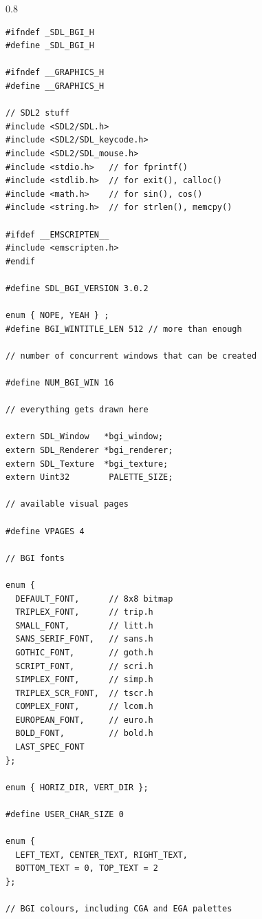 \documentclass[a4paper,12pt]{article}
\newenvironment{margins}[2]
{ %
\begin{list}{}
{
\setlength{\leftmargin}{#1}
\setlength{\rightmargin}{#2}
} \item
} %
{\end{list}}
\begin{document}
\begin{margins}{-0.5cm}{-0.5cm}

\begin{spacing}{0.8}
\begin{lstlisting}
#ifndef _SDL_BGI_H
#define _SDL_BGI_H

#ifndef __GRAPHICS_H
#define __GRAPHICS_H

// SDL2 stuff
#include <SDL2/SDL.h>
#include <SDL2/SDL_keycode.h>
#include <SDL2/SDL_mouse.h>
#include <stdio.h>   // for fprintf()
#include <stdlib.h>  // for exit(), calloc()
#include <math.h>    // for sin(), cos()
#include <string.h>  // for strlen(), memcpy()

#ifdef __EMSCRIPTEN__
#include <emscripten.h>
#endif

#define SDL_BGI_VERSION 3.0.2

enum { NOPE, YEAH } ;
#define BGI_WINTITLE_LEN 512 // more than enough

// number of concurrent windows that can be created

#define NUM_BGI_WIN 16

// everything gets drawn here

extern SDL_Window   *bgi_window;
extern SDL_Renderer *bgi_renderer;
extern SDL_Texture  *bgi_texture;
extern Uint32        PALETTE_SIZE;

// available visual pages

#define VPAGES 4

// BGI fonts

enum {
  DEFAULT_FONT,      // 8x8 bitmap
  TRIPLEX_FONT,      // trip.h
  SMALL_FONT,        // litt.h
  SANS_SERIF_FONT,   // sans.h
  GOTHIC_FONT,       // goth.h
  SCRIPT_FONT,       // scri.h
  SIMPLEX_FONT,      // simp.h
  TRIPLEX_SCR_FONT,  // tscr.h
  COMPLEX_FONT,      // lcom.h
  EUROPEAN_FONT,     // euro.h
  BOLD_FONT,         // bold.h
  LAST_SPEC_FONT
};

enum { HORIZ_DIR, VERT_DIR };

#define USER_CHAR_SIZE 0

enum {
  LEFT_TEXT, CENTER_TEXT, RIGHT_TEXT,
  BOTTOM_TEXT = 0, TOP_TEXT = 2
};

// BGI colours, including CGA and EGA palettes


\end{lstlisting}
\end{spacing}
\end{margins}
\end{document}
